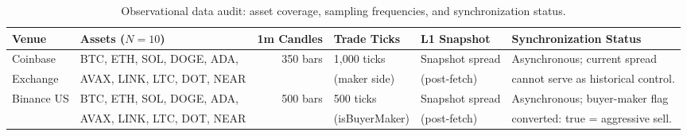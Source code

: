 \begin{table}[htbp]
\centering\small
\caption{Observational data audit: asset coverage, sampling frequencies, and synchronization status.}
\label{tab:T5_public_data}
\begin{tabular}{llrlll}
\toprule
Venue & Assets ($N=10$) & 1m Candles & Trade Ticks & L1 Snapshot & Synchronization Status \\
\midrule
Coinbase & BTC, ETH, SOL, DOGE, ADA, & 350 bars & 1,000 ticks & Snapshot spread & Asynchronous; current spread \\
Exchange & AVAX, LINK, LTC, DOT, NEAR & & (maker side) & (post-fetch) & cannot serve as historical control. \\
\midrule
Binance US & BTC, ETH, SOL, DOGE, ADA, & 500 bars & 500 ticks & Snapshot spread & Asynchronous; buyer-maker flag \\
 & AVAX, LINK, LTC, DOT, NEAR & & (isBuyerMaker) & (post-fetch) & converted: true = aggressive sell. \\
\bottomrule
\end{tabular}
\end{table}
